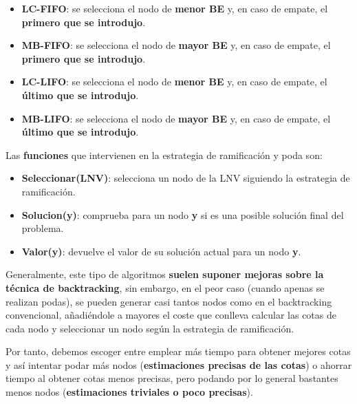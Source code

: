 \documentclass{article}
\begin{document}
\begin{itemize}
    \item \textbf{LC-FIFO}: se selecciona el nodo de \textbf{menor BE} y, en caso de empate, el \textbf{primero que se introdujo}.
    \item \textbf{MB-FIFO}: se selecciona el nodo de \textbf{mayor BE} y, en caso de empate, el \textbf{primero que se introdujo}.
    \item \textbf{LC-LIFO}: se selecciona el nodo de \textbf{menor BE} y, en caso de empate, el \textbf{último que se introdujo}.
    \item \textbf{MB-LIFO}: se selecciona el nodo de \textbf{mayor BE} y, en caso de empate, el \textbf{último que se introdujo}.
\end{itemize}

Las \textbf{funciones} que intervienen en la estrategia de ramificación y poda son: 
\begin{itemize}
    \item \textbf{Seleccionar(LNV)}: selecciona un nodo de la LNV siguiendo la estrategia de ramificación.
    \item \textbf{Solucion(y)}: comprueba para un nodo \textbf{y} si es una posible solución final del problema.
    \item \textbf{Valor(y)}: devuelve el valor de su solución actual para un nodo \textbf{y}. 
\end{itemize}

Generalmente, este tipo de algoritmos \textbf{suelen suponer mejoras sobre la técnica de backtracking}, sin embargo, en el peor caso (cuando apenas se realizan podas), se pueden generar casi tantos nodos como en el backtracking convencional, añadiéndole a mayores el coste que conlleva calcular las cotas de cada nodo y seleccionar un nodo según la estrategia de ramificación. 

Por tanto, debemos escoger entre emplear más tiempo para obtener mejores cotas y así intentar podar más nodos (\textbf{estimaciones precisas de las cotas}) o ahorrar tiempo al obtener cotas menos precisas, pero podando por lo general bastantes menos nodos (\textbf{estimaciones triviales o poco precisas}).

\begin{comment}
\begin{figure}[h]
    \centering
    \texttt{[image: 1.png]}
    \caption{}
\end{figure}
\end{comment}

\begin{comment}
\begin{wrapfigure}[]{r}{0.45\linewidth}
    \centering
    \texttt{[image: 8.png]}
    \caption{}
\end{wrapfigure}
\end{comment}
\end{document}
